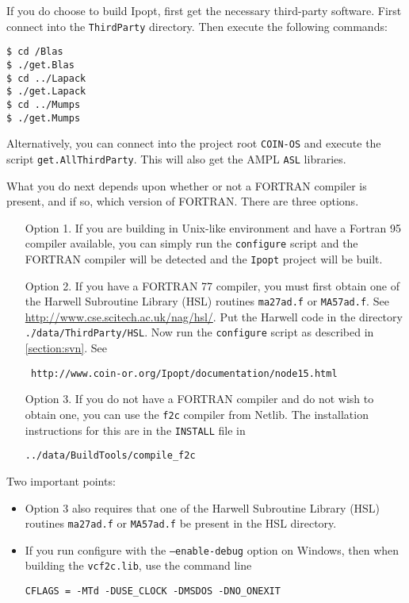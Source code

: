 \documentclass[11pt]{article}
\renewcommand{\_}{{\char"5F}}
\renewcommand{\{}{{\char"7B}}
\renewcommand{\}}{{\char"7D}}
\renewcommand{\^}{{\char"0D}}
\renewcommand{\'}{{\char"0D}}
\begin{document}
If you do choose to build Ipopt, first get the necessary third-party software.  First connect into the {\tt ThirdParty} directory. Then execute the following commands:

\begin{verbatim}
$ cd /Blas
$ ./get.Blas
$ cd ../Lapack
$ ./get.Lapack
$ cd ../Mumps
$ ./get.Mumps
\end{verbatim}

Alternatively, you can connect into the project root {\tt COIN-OS} and execute the script {\tt get.AllThirdParty}.  This will also get the AMPL {\tt ASL} libraries.

What you do next depends upon whether or not a FORTRAN compiler is present, and if so, which version of FORTRAN.  There are three options.

\begin{itemize}

\item[Option 1.]   If you are building in Unix-like environment and have a Fortran 95 compiler available, you can simply run the {\tt configure} script and the FORTRAN compiler will be detected and the {\tt Ipopt} project will be built.

\item[Option 2.]   If you have a FORTRAN 77 compiler, you  must first obtain one of the   Harwell Subroutine Library (HSL) routines {\tt ma27ad.f} or {\tt MA57ad.f}.  See \url{http://www.cse.scitech.ac.uk/nag/hsl/}.  Put the Harwell code in the directory {\tt \../data/ThirdParty/HSL}.  Now run the {\tt configure} script as described in \ref{section:svn}.  See

\begin{verbatim}
 http://www.coin-or.org/Ipopt/documentation/node15.html
 \end{verbatim}

\item[Option 3.]  If you do not have a FORTRAN compiler and do not wish to obtain one, you can use the {\tt f2c} compiler from Netlib.  The installation instructions for this are in the {\tt INSTALL} file in
\begin{verbatim}
../data/BuildTools/compile_f2c
\end{verbatim}

\end{itemize}

\noindent Two important points:


\begin{itemize}
\item Option 3 also requires that  one of the  Harwell Subroutine Library (HSL) routines {\tt ma27ad.f} or  {\tt MA57ad.f} be present in the HSL directory.

\item If you run configure with the {\tt --enable-debug} option on Windows, then when building the {\tt vcf2c.lib}, use the command line

\begin{verbatim}
CFLAGS = -MTd -DUSE_CLOCK -DMSDOS -DNO_ONEXIT
\end{verbatim}

\end{itemize}
\end{document}
